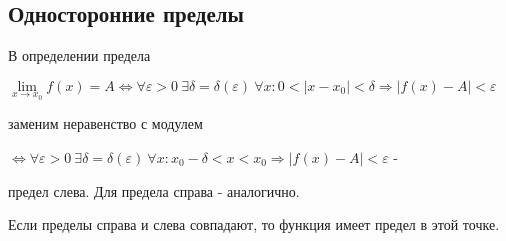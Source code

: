 \subsection{Односторонние пределы}

В определении предела 

$\lim\limits_{x \to x_0} f \left( x \right) = A \Leftrightarrow \forall \varepsilon > 0 ~ \exists \delta = \delta \left( \varepsilon \right) ~ \forall x \colon 0 < \left| x - x_0 \right| < \delta \Rightarrow \left| f \left( x \right) - A \right| < \varepsilon$

заменим неравенство с модулем

$ \Leftrightarrow \forall \varepsilon > 0 ~ \exists \delta = \delta \left( \varepsilon \right) ~ \forall x \colon x_0 - \delta < x < x_0 \Rightarrow \left| f \left( x \right) - A \right| < \varepsilon $ - 

предел слева.
Для предела справа - аналогично.

Если пределы справа и слева совпадают, то функция имеет предел в этой точке.


